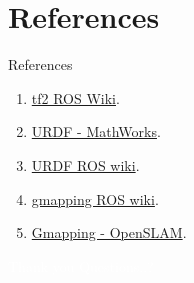 \documentclass{beamer}
\begin{document}
\section{References}
\begin{frame}{References}
	
	\begin{enumerate}
		\item \href{http://wiki.ros.org/tf2}{tf2 ROS Wiki}.
		\item \href{https://www.mathworks.com/help/sm/ug/urdf-model-import.html}{URDF - MathWorks}.
		\item \href{http://wiki.ros.org/urdf}{URDF ROS wiki}.
		\item \href{http://wiki.ros.org/gmapping}{gmapping ROS wiki}.   
		\item \href{https://openslam-org.github.io/}{Gmapping - OpenSLAM}.     
	\end{enumerate}
\end{frame}

\begin{frame}[plain]{}  
	\centering
	{\huge \textcolor{white}{Thank you} }
	\linebreak
	\vspace{1.0cm}
	{\huge \textcolor{white}{Questions..?} }
\end{frame}
\end{document}
